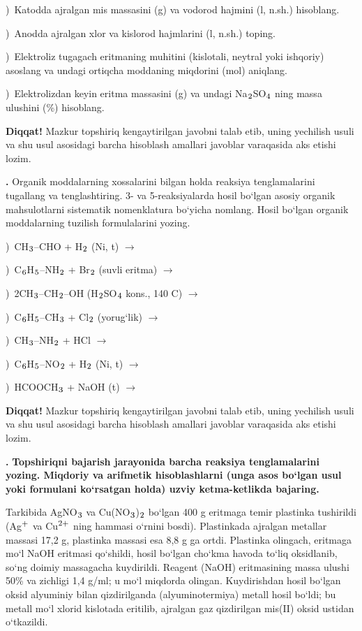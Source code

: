 \documentclass[11pt,a4paper]{article}
\renewcommand{\textsubscript}[1]{\ensuremath{_{\text{\fontsize{8}{8}\selectfont #1}}}}
\renewcommand{\textsuperscript}[1]{\ensuremath{^{\text{\fontsize{8}{8}\selectfont #1}}}}
\newcommand{\qn}[1]{\textbf{\fontsize{11.5}{13}\selectfont #1}}
\newcommand{\qsep}{\par\vspace{13pt}}
\newcommand{\diqqat}[1]{\par\smallskip\noindent\textbf{Diqqat!} #1\par\medskip}
\begin{document}
)\ Katodda ajralgan mis massasini (g) va vodorod hajmini (l, n.sh.) hisoblang.\par
{})\ Anodda ajralgan xlor va kislorod hajmlarini (l, n.sh.) toping.\par
{})\ Elektroliz tugagach eritmaning muhitini (kislotali, neytral yoki ishqoriy) asoslang va undagi ortiqcha moddaning miqdorini (mol) aniqlang.\par
{})\ Elektrolizdan keyin eritma massasini (g) va undagi Na\textsubscript{2}SO\textsubscript{4} ning massa ulushini (\%) hisoblang.\par
\diqqat{Mazkur topshiriq kengaytirilgan javobni talab etib, uning yechilish usuli va shu usul asosidagi barcha hisoblash amallari javoblar varaqasida aks etishi lozim.}\qsep
\noindent\qn{42.} Organik moddalarning xossalarini bilgan holda reaksiya tenglamalarini tugallang va tenglashtiring. 3- va 5-reaksiyalarda hosil bo`lgan asosiy organik mahsulotlarni sistematik nomenklatura bo`yicha nomlang. Hosil bo`lgan organik moddalarning tuzilish formulalarini yozing.\par
{})\ CH\textsubscript{3}--CHO + H\textsubscript{2} (Ni, t) $\to$\par
{})\ C\textsubscript{6}H\textsubscript{5}--NH\textsubscript{2} + Br\textsubscript{2} (suvli eritma) $\to$\par
{})\ 2CH\textsubscript{3}--CH\textsubscript{2}--OH (H\textsubscript{2}SO\textsubscript{4} kons., 140 \textdegree{}C) $\to$\par
{})\ C\textsubscript{6}H\textsubscript{5}--CH\textsubscript{3} + Cl\textsubscript{2} (yorug`lik) $\to$\par
{})\ CH\textsubscript{3}--NH\textsubscript{2} + HCl $\to$\par
{})\ C\textsubscript{6}H\textsubscript{5}--NO\textsubscript{2} + H\textsubscript{2} (Ni, t) $\to$\par
{})\ HCOOCH\textsubscript{3} + NaOH (t) $\to$\par
\diqqat{Mazkur topshiriq kengaytirilgan javobni talab etib, uning yechilish usuli va shu usul asosidagi barcha hisoblash amallari javoblar varaqasida aks etishi lozim.}\qsep
\noindent\qn{43.} \textbf{Topshiriqni bajarish jarayonida barcha reaksiya tenglamalarini yozing. Miqdoriy va arifmetik hisoblashlarni (unga asos bo`lgan usul yoki formulani ko`rsatgan holda) uzviy ketma-ketlikda bajaring.}\par\smallskip
Tarkibida AgNO\textsubscript{3} va Cu(NO\textsubscript{3})\textsubscript{2} bo`lgan 400 g eritmaga temir plastinka tushirildi (Ag\textsuperscript{+} va Cu\textsuperscript{2+} ning hammasi o`rnini bosdi). Plastinkada ajralgan metallar massasi 17,2 g, plastinka massasi esa 8,8 g ga ortdi. Plastinka olingach, eritmaga mo`l NaOH eritmasi qo`shildi, hosil bo`lgan cho`kma havoda to`liq oksidlanib, so`ng doimiy massagacha kuydirildi. Reagent (NaOH) eritmasining massa ulushi 50\% va zichligi 1,4 g/ml; u mo`l miqdorda olingan. Kuydirishdan hosil bo`lgan oksid alyuminiy bilan qizdirilganda (alyuminotermiya) metall hosil bo`ldi; bu metall mo`l xlorid kislotada eritilib, ajralgan gaz qizdirilgan mis(II) oksid ustidan o`tkazildi.\par
\end{document}
